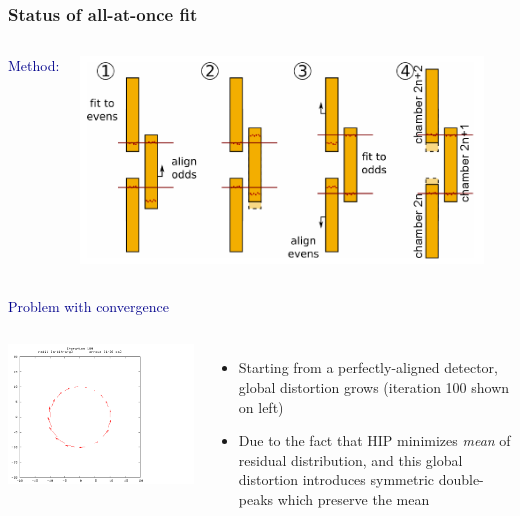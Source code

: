 \documentclass[compress]{beamer}
\begin{document}
\begin{frame}
\frametitle{Status of all-at-once fit}

\vspace{-0.3 cm}
\begin{columns}
\textcolor{darkblue}{\Large Method:}

\begin{center}
\includegraphics[width=0.8\linewidth]{even-odd.png}
\end{center}

\mbox{ }
\end{columns}

\vfill
\hspace{-0.83 cm} \textcolor{darkblue}{\Large Problem with convergence}

\begin{columns}
\includegraphics[width=1.5\linewidth]{beamhalo_APE_r0_t100000_Xf0mm_iter100.png}

\begin{itemize}
\item Starting from a perfectly-aligned detector, global distortion grows (iteration 100 shown on left)
\item Due to the fact that HIP minimizes {\it mean} of residual
distribution, and this global distortion introduces symmetric
double-peaks which preserve the mean
\end{itemize}
\end{columns}
\end{frame}
\end{document}
